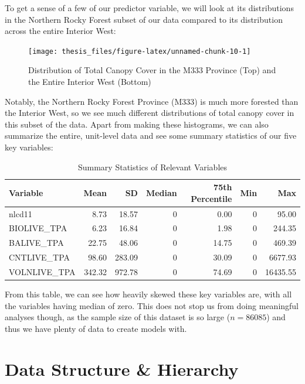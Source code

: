 \documentclass[12pt,twoside]{reedthesis}
\begin{document}
To get a sense of a few of our predictor variable, we will look at its distributions in the Northern Rocky Forest subset of our data compared to its distribution across the entire Interior West:
\begin{figure}

{\centering \texttt{[image: thesis\_files/figure-latex/unnamed-chunk-10-1]} 

}

\caption{Distribution of Total Canopy Cover in the M333 Province (Top) and the Entire Interior West (Bottom)}\label{fig:unnamed-chunk-10}
\end{figure}
Notably, the Northern Rocky Forest Province (M333) is much more forested than the Interior West, so we see much different distributions of total canopy cover in this subset of the data. Apart from making these histograms, we can also summarize the entire, unit-level data and see some summary statistics of our five key variables:
\begin{longtable}[t]{lrrrrrr}
\caption[Summary Statistics of Relevant Variables]{\label{tab:unnamed-chunk-11}Summary Statistics of Relevant Variables}\\
\toprule
Variable & Mean & SD & Median & 75th Percentile & Min & Max\\
\midrule
nlcd11 & 8.73 & 18.57 & 0 & 0.00 & 0 & 95.00\\
BIOLIVE\_TPA & 6.23 & 16.84 & 0 & 1.98 & 0 & 244.35\\
BALIVE\_TPA & 22.75 & 48.06 & 0 & 14.75 & 0 & 469.39\\
CNTLIVE\_TPA & 98.60 & 283.09 & 0 & 30.09 & 0 & 6677.93\\
VOLNLIVE\_TPA & 342.32 & 972.78 & 0 & 74.69 & 0 & 16435.55\\
\bottomrule
\end{longtable}
From this table, we can see how heavily skewed these key variables are, with all the variables having median of zero. This does not stop us from doing meaningful analyses though, as the sample size of this dataset is so large (\(n = 86085\)) and thus we have plenty of data to create models with.

\hypertarget{data-structure-hierarchy}{%
\section{Data Structure \& Hierarchy}\label{data-structure-hierarchy}}
\end{document}

